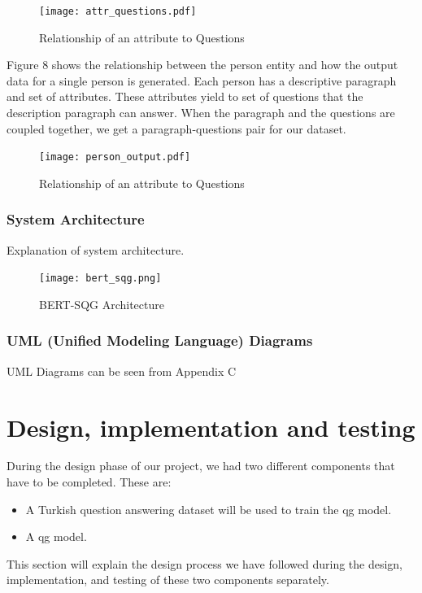 \documentclass{mefsdp}
\begin{document}
	\begin{figure}[h]
		\centering
		\texttt{[image: attr\_questions.pdf]}
		\caption{Relationship of an attribute to Questions\label{attr-qg}}
	\end{figure}
	
	
	Figure 8 shows the relationship between the person entity and how the output data for a single person is generated. Each person has a descriptive paragraph and set of attributes. These attributes yield to set of questions that the description paragraph can answer. When the paragraph and the questions are coupled together, we get a paragraph-questions pair for our dataset. \newline \par
	
	\begin{figure}[h]
		\centering
		\texttt{[image: person\_output.pdf]}
		\caption{Relationship of an attribute to Questions}
	\end{figure}
	
	\newpage
	\subsubsection{System Architecture }
	Explanation of system architecture.
	\begin{figure}[h!]
		\centering
		\texttt{[image: bert\_sqg.png]}
		\caption{BERT-SQG Architecture \cite{chan-fan-2019-bert}\label{bertsqg-arch}}
	\end{figure}
	
	\subsubsection{UML (Unified Modeling Language) Diagrams}
	UML Diagrams can be seen from Appendix C
	
	\section{Design, implementation and testing}
	During the design phase of our project, we had two different components that have to be completed. These are:
	\begin{itemize}
		\item A Turkish question answering dataset will be used to train the \gls{qg} model.
		\item A \gls{qg} model.
	\end{itemize}
	This section will explain the design process we have followed during the design, implementation, and testing of these two components separately.
\end{document}
